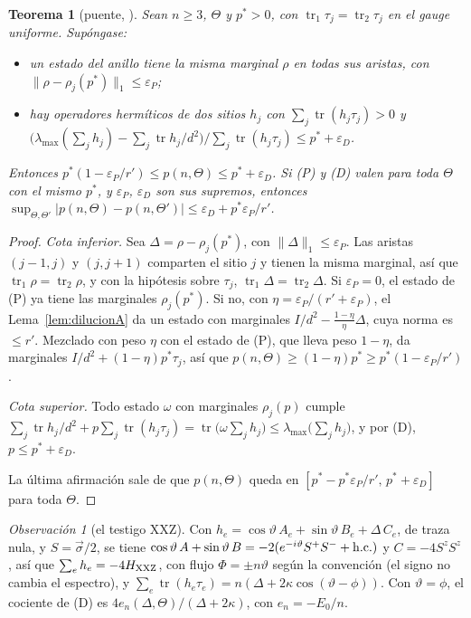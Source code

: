 \documentclass[11pt,a4paper]{article}
\newtheorem{teorema}{Teorema}
\theoremstyle{remark}
\newtheorem*{observacion}{Observación}
\newcommand{\tr}{\operatorname{tr}}
\begin{document}
\begin{teorema}[puente, {\cite[Teorema~4]{robustez}}]\label{teo:puenteA}
Sean $n\ge3$, $\Theta$ y $p^\ast>0$, con $\tr_1\tau_j=\tr_2\tau_j$ en el gauge uniforme. Supóngase:
\begin{itemize}
\item[(P)] un estado del anillo tiene la misma marginal $\rho$ en todas sus aristas, con
  $\|\rho-\rho_j(p^\ast)\|_1\le\varepsilon_P$;
\item[(D)] hay operadores hermíticos de dos sitios $h_j$ con $\sum_j\tr(h_j\tau_j)>0$ y
  $\big(\lambda_{\max}(\sum_jh_j)-\sum_j\tr h_j/d^2\big)/\sum_j\tr(h_j\tau_j)\le p^\ast+\varepsilon_D$.
\end{itemize}
Entonces $p^\ast(1-\varepsilon_P/r')\le p(n,\Theta)\le p^\ast+\varepsilon_D$. Si (P) y (D) valen para toda
$\Theta$ con el mismo $p^\ast$, y $\varepsilon_P$, $\varepsilon_D$ son sus supremos, entonces
$\sup_{\Theta,\Theta'}|p(n,\Theta)-p(n,\Theta')|\le\varepsilon_D+p^\ast\varepsilon_P/r'$.
\end{teorema}

\begin{proof}
\emph{Cota inferior.} Sea $\Delta=\rho-\rho_j(p^\ast)$, con $\|\Delta\|_1\le\varepsilon_P$. Las aristas
$(j{-}1,j)$ y $(j,j{+}1)$ comparten el sitio $j$ y tienen la misma marginal, así que $\tr_1\rho=\tr_2\rho$,
y con la hipótesis sobre $\tau_j$, $\tr_1\Delta=\tr_2\Delta$. Si $\varepsilon_P=0$, el estado de (P) ya tiene las
marginales $\rho_j(p^\ast)$. Si no, con $\eta=\varepsilon_P/(r'+\varepsilon_P)$, el
Lema~\ref{lem:dilucionA} da un estado con marginales $I/d^2-\frac{1-\eta}\eta\Delta$, cuya norma es
$\le r'$. Mezclado con peso $\eta$ con el estado de (P), que lleva peso $1-\eta$, da marginales
$I/d^2+(1-\eta)p^\ast\tau_j$, así que $p(n,\Theta)\ge(1-\eta)p^\ast\ge p^\ast(1-\varepsilon_P/r')$.

\emph{Cota superior.} Todo estado $\omega$ con marginales $\rho_j(p)$ cumple
$\sum_j\tr h_j/d^2+p\sum_j\tr(h_j\tau_j)=\tr\big(\omega\sum_jh_j\big)\le\lambda_{\max}\big(\sum_jh_j\big)$, y
por (D), $p\le p^\ast+\varepsilon_D$.

La última afirmación sale de que $p(n,\Theta)$ queda en $[p^\ast-p^\ast\varepsilon_P/r',\,p^\ast+\varepsilon_D]$
para toda $\Theta$.
\end{proof}

\begin{observacion}[el testigo XXZ]
Con $h_e=\cos\vartheta\,A_e+\sin\vartheta\,B_e+\Delta\,C_e$, de traza nula, y $S=\vec\sigma/2$, se tiene
$\cos\vartheta\,A+\sin\vartheta\,B=-2(e^{-i\vartheta}S^+S^-+{\rm h.c.})$ y $C=-4S^zS^z$, así que
$\sum_eh_e=-4H_{\rm XXZ}$, con flujo $\Phi=\pm n\vartheta$ según la convención (el signo no cambia el
espectro), y $\sum_e\tr(h_e\tau_e)=n(\Delta+2\kappa\cos(\vartheta-\phi))$. Con $\vartheta=\phi$, el cociente de
(D) es $4e_n(\Delta,\Theta)/(\Delta+2\kappa)$, con $e_n=-E_0/n$.
\end{observacion}
\end{document}
